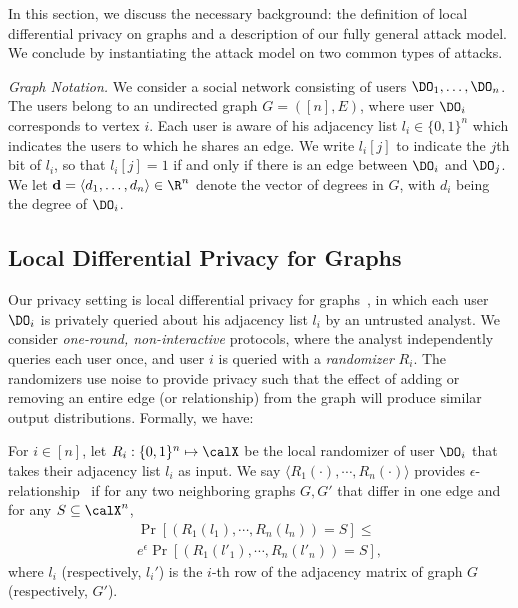 In this section, we discuss the necessary background: the definition of local differential privacy on graphs and a description of our fully general attack model. We conclude by instantiating the attack model on two common types of attacks.

\textit{Graph Notation.}
We consider a social network consisting of users $\DO_1, \ldots, \DO_n$. The users belong to an undirected graph $G = ([n], E)$, where user $\DO_i$ corresponds to vertex $i$. Each user is aware of his adjacency list $l_i \in \{0,1\}^n$ which indicates the users to which he shares an edge. We write $l_i[j]$ to indicate the $j$th bit of $l_i$, so that $l_i[j]=1$ if and only if there is an edge between $\DO_i$ and $\DO_j$. We let $\textbf{d}=\langle d_1, \ldots, d_n\rangle \in \R^n$ denote the vector of degrees in $G$, with $d_i$ being the degree of $\DO_i$.

\subsection{Local Differential Privacy for Graphs}\label{sec:ldp}

Our privacy setting is local differential privacy for graphs~\cite{imola2021locally}, in which each user $\DO_i$ is privately queried about his adjacency list $l_i$ by an untrusted analyst. We consider \emph{one-round, non-interactive} protocols, where the analyst independently queries each user once, and user $i$ is queried with a \emph{randomizer} $R_i$. The randomizers use noise to provide privacy such that the effect of adding or removing an entire edge (or relationship) from the graph will produce similar output distributions. Formally, we have:

\begin{defn}  For $i \in [n]$,
let $R_i: \{0,1\}^n\mapsto \calX$ be the local randomizer of user $\DO_i$ that takes their adjacency list $l_i$ as input.
We say $\langle R_1(\cdot),\cdots,R_n(\cdot)\rangle$ provides $\epsilon$-relationship \DP~if for any
two neighboring graphs $G,G'$ that differ in one edge and
for any $S\subseteq \calX^n$,
\begin{gather*}
\Pr[(R_1(l_1),\cdots,R_n(l_n)) = S]
\leq \\e^{\epsilon} \Pr[(R_1(l'_1),\cdots,R_n(l'_n))=S], \end{gather*}
where $l_i$ (respectively, $l_i'$)
is the $i$-th row of the adjacency
matrix of graph $G$ (respectively, $G'$).\end{defn}

